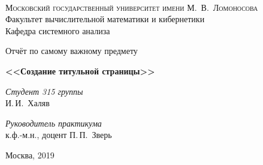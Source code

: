 \documentclass[11pt]{article}
\begin{document}
\thispagestyle{empty}
\begin{center}
\ \vspace{-3cm}

{\scshape Московский государственный университет имени М.~В.~Ломоносова}\\
Факультет вычислительной математики и кибернетики\\
Кафедра системного анализа

\vfill

{\LARGE Отчёт по самому важному предмету}

\vspace{1cm}

{\Huge\bfseries <<Создание титульной страницы>>}
\end{center}

\vspace{1cm}

\begin{flushright}
  \large
  \textit{Студент 315 группы}\\
  И.\,И.~Халяв

  \vspace{5mm}

  \textit{Руководитель практикума}\\
  к.ф.-м.н., доцент П.\,П.~Зверь
\end{flushright}

\vfill

\begin{center}
Москва, 2019
\end{center}
\end{document}
